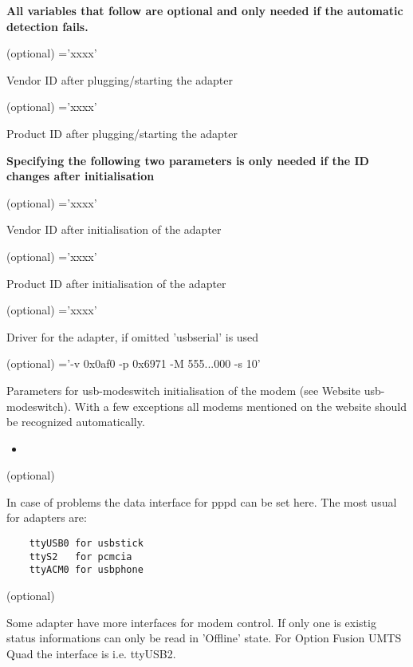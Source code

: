 \begin{description}
\textbf{All variables that follow are optional and only needed if the automatic detection fails.}


	(optional) ='xxxx'

	Vendor ID after plugging/starting the adapter


	(optional) ='xxxx'

	Product ID after plugging/starting the adapter

\textbf{Specifying the following two parameters is only needed if the ID changes after initialisation}

	(optional) ='xxxx'

	Vendor ID after initialisation of the adapter


	(optional) ='xxxx'

	Product ID after initialisation of the adapter


	(optional) ='xxxx'

	Driver for the adapter, if omitted 'usbserial' is used


	(optional) ='-v 0x0af0 -p 0x6971 -M 555...000 -s 10'

	Parameters for usb-modeswitch initialisation of the modem (see Website 
	usb-modeswitch). With a few exceptions all modems mentioned on the website should be 
	recognized automatically.
	
	\begin{itemize}
	\item {}
	\end{itemize}


	(optional)

	In case of problems the data interface for pppd can be set here. 
	The most usual for adapters are:

	\begin{verbatim}
	ttyUSB0 for usbstick
	ttyS2   for pcmcia
	ttyACM0 for usbphone
	\end{verbatim}


	(optional)

	Some adapter have more interfaces for modem control. If only one is 
	existig status informations can only be read in	'Offline' state. 
	For Option Fusion UMTS Quad the interface is i.e. ttyUSB2.

\end{description}
